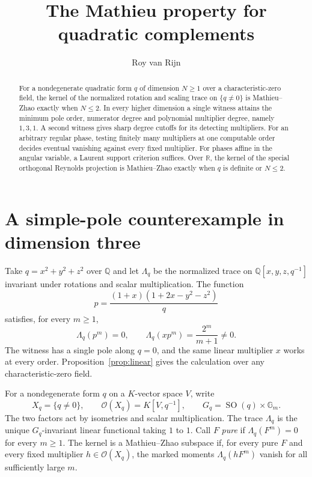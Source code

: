 \documentclass[11pt]{article}
\title{The Mathieu property for quadratic complements}
\author{Roy van Rijn}
\date{}
\DeclareMathOperator{\SO}{SO}
\newcommand{\Gm}{\mathbb G_m}
\newcommand{\Lq}{\Lambda_q}
\begin{document}
\maketitle

\begin{abstract}
For a nondegenerate quadratic form \(q\) of dimension \(N\ge1\) over a
characteristic-zero field, the kernel of the normalized rotation and
scaling trace on \(\{q\ne0\}\) is Mathieu--Zhao exactly when \(N\le2\).
In every higher dimension a single witness attains the minimum pole
order, numerator degree and polynomial multiplier degree, namely
\(1,3,1\). A second witness gives sharp degree cutoffs for its detecting
multipliers. For an arbitrary regular phase, testing finitely many
multipliers at one computable order decides eventual vanishing
against every fixed multiplier. For phases affine in the angular
variable, a Laurent support criterion suffices. Over \(\mathbb R\),
the kernel of the special orthogonal Reynolds projection is
Mathieu--Zhao exactly when \(q\) is definite or \(N\le2\).
\end{abstract}

\section{A simple-pole counterexample in dimension three}

Take \(q=x^2+y^2+z^2\) over \(\mathbb Q\) and let \(\Lq\) be the normalized
trace on \(\mathbb Q[x,y,z,q^{-1}]\) invariant under rotations and scalar
multiplication. The function
\[
   p=\frac{(1+x)(1+2x-y^2-z^2)}{q}
\]
satisfies, for every \(m\ge1\),
\begin{equation}\label{eq:opening}
   \Lq(p^m)=0,\qquad \Lq(xp^m)=\frac{2^m}{m+1}\ne0 .
\end{equation}
The witness has a single pole along \(q=0\), and the same linear
multiplier \(x\) works at every order. Proposition~\ref{prop:linear}
gives the calculation over any characteristic-zero field.

For a nondegenerate form \(q\) on a \(K\)-vector space \(V\), write
\[
 X_q=\{q\ne0\},\qquad \mathcal O(X_q)=K[V,q^{-1}],
 \qquad G_q=\SO(q)\times\Gm .
\]
The two factors act by isometries and scalar multiplication.
The trace \(\Lq\) is the unique \(G_q\)-invariant linear functional
taking \(1\) to \(1\). Call \(F\) \emph{pure} if \(\Lq(F^m)=0\) for
every \(m\ge1\). The kernel is a Mathieu--Zhao subspace if, for every
pure \(F\) and every fixed multiplier \(h\in\mathcal O(X_q)\), the
marked moments \(\Lq(hF^m)\) vanish for all sufficiently large \(m\).
\end{document}

